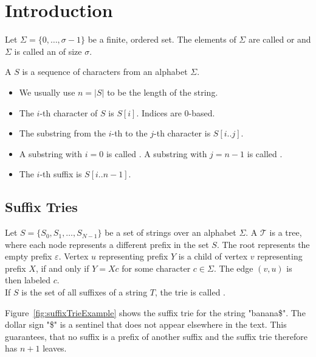 \chapter{Introduction}

\begin{Definition}
  Let $\Sigma = \{0, \ldots, \sigma - 1\}$ be a finite, ordered set. The elements of $\Sigma$ are called  or  and $\Sigma$ is called an  of size $\sigma$.
\end{Definition}

\begin{Definition}
  A  $S$ is a sequence of characters from an alphabet $\Sigma$.
  \begin{itemize}
    \item We usually use $n = \vert S \vert$ to be the length of the string.
    \item The $i$-th character of $S$ is $S[i]$. Indices are $0$-based.
    \item The substring from the $i$-th to the $j$-th character is $S[i..j]$.
    \item A substring with $i = 0$ is called . A substring with $j = n - 1$ is called .
    \item The $i$-th suffix is $S[i..n-1]$.
  \end{itemize}
\end{Definition}

\section{Suffix Tries}

\begin{Definition}
  Let $S = \{S_0, S_1, \ldots, S_{N-1}\}$ be a set of strings over an alphabet $\Sigma$. A  $\mathcal{T}$ is a tree, where each node represents a different prefix in the set $S$. The root represents the empty prefix $\varepsilon$. Vertex $u$ representing prefix $Y$ is a child of vertex $v$ representing prefix $X$, if and only if $Y = Xc$ for some character $c \in \Sigma$. The edge $(v,u)$ is then labeled $c$.\\
  If $S$ is the set of all suffixes of a string $T$, the trie is called .
\end{Definition}

\begin{Example}
  Figure~\ref{fig:suffixTrieExample} shows the suffix trie for the string "banana\$". The dollar sign "\$" is a sentinel that does not appear elsewhere in the text. This guarantees, that no suffix is a prefix of another suffix and the suffix trie therefore has $n+1$ leaves.
\end{Example}

